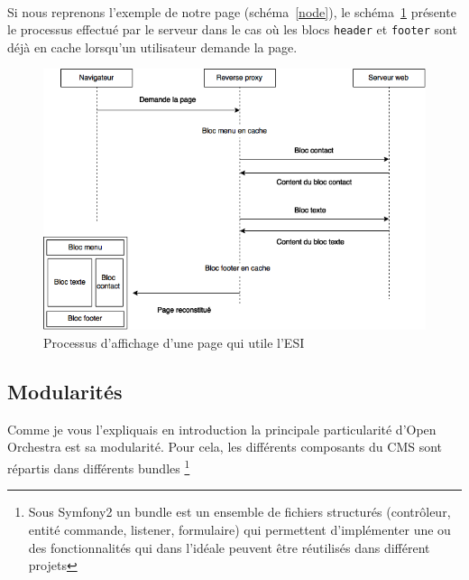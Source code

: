    \paragraph{}
   Si nous reprenons l'exemple de notre page (schéma~\ref{node}), le schéma~\ref{esi} présente le processus effectué par le serveur dans le cas où les blocs \verb?header? et \verb?footer? sont déjà en cache lorsqu'un utilisateur demande la page.
   		\begin{figure}[H]
        \begin{center}
          \includegraphics[scale=0.75]{images/esi}
        \end{center}
        \caption{Processus d'affichage d'une page qui utile l'ESI}
        \label{esi}
      \end{figure}
   
   \subsection{Modularités}
   Comme je vous l'expliquais en introduction la principale particularité d'Open Orchestra est sa modularité. Pour cela, les différents composants du CMS sont répartis dans différents bundles \footnote{Sous Symfony2 un bundle est un ensemble de fichiers structurés (contrôleur, entité commande, listener, formulaire) qui permettent d'implémenter une ou des fonctionnalités qui dans l'idéale peuvent être réutilisés dans différent projets}

